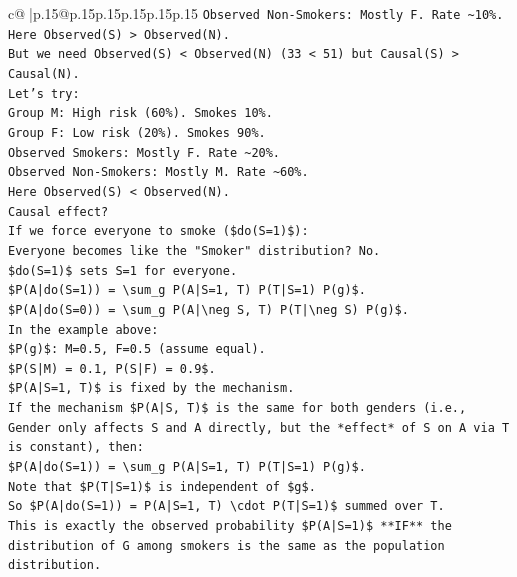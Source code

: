 \documentclass{article}
\begin{document}
{\begin{supertabular}{c@{$\;$}|p{.15\linewidth}@{}p{.15\linewidth}p{.15\linewidth}p{.15\linewidth}p{.15\linewidth}p{.15\linewidth}}
{{{\texttt{Observed Non{-}Smokers: Mostly F. Rate \textasciitilde{}10\%.} \\
\texttt{Here Observed(S) > Observed(N).} \\
\texttt{But we need Observed(S) < Observed(N) (33 < 51) but Causal(S) > Causal(N).} \\
\texttt{Let's try:} \\
\texttt{Group M: High risk (60\%). Smokes 10\%.} \\
\texttt{Group F: Low risk (20\%). Smokes 90\%.} \\
\texttt{Observed Smokers: Mostly F. Rate \textasciitilde{}20\%.} \\
\texttt{Observed Non{-}Smokers: Mostly M. Rate \textasciitilde{}60\%.} \\
\texttt{Here Observed(S) < Observed(N).} \\
\texttt{Causal effect?} \\
\texttt{If we force everyone to smoke (\$do(S=1)\$):} \\
\texttt{Everyone becomes like the "Smoker" distribution? No.} \\
\texttt{\$do(S=1)\$ sets S=1 for everyone.} \\
\texttt{\$P(A|do(S=1)) = \textbackslash{}sum\_g P(A|S=1, T) P(T|S=1) P(g)\$.} \\
\texttt{\$P(A|do(S=0)) = \textbackslash{}sum\_g P(A|\textbackslash{}neg S, T) P(T|\textbackslash{}neg S) P(g)\$.} \\
\texttt{In the example above:} \\
\texttt{\$P(g)\$: M=0.5, F=0.5 (assume equal).} \\
\texttt{\$P(S|M) = 0.1, P(S|F) = 0.9\$.} \\
\texttt{\$P(A|S=1, T)\$ is fixed by the mechanism.} \\
\texttt{If the mechanism \$P(A|S, T)\$ is the same for both genders (i.e., Gender only affects S and A directly, but the *effect* of S on A via T is constant), then:} \\
\texttt{\$P(A|do(S=1)) = \textbackslash{}sum\_g P(A|S=1, T) P(T|S=1) P(g)\$.} \\
\texttt{Note that \$P(T|S=1)\$ is independent of \$g\$.} \\
\texttt{So \$P(A|do(S=1)) = P(A|S=1, T) \textbackslash{}cdot P(T|S=1)\$ summed over T.} \\
\texttt{This is exactly the observed probability \$P(A|S=1)\$ **IF** the distribution of G among smokers is the same as the population distribution.} \\
}}}
\end{supertabular}}
\end{document}
